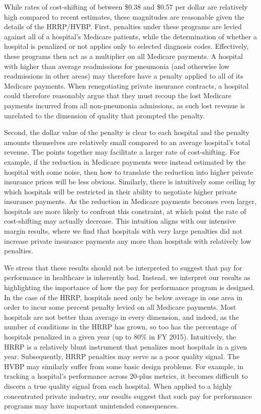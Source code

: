 \documentclass[12pt]{article}
\begin{document}
While rates of cost-shifting of between \$0.38 and \$0.57 per dollar are relatively high compared to recent estimates, these magnitudes are reasonable given the details of the HRRP/HVBP. First, penalties under these programs are levied against all of a hospital's Medicare patients, while the determination of whether a hospital is penalized or not applies only to selected diagnosis codes. Effectively, these programs then act as a multiplier on all Medicare payments. A hospital with higher than average readmissions for pneumonia (and otherwise low readmissions in other areas) may therefore have a penalty applied to all of its Medicare payments. When renegotiating private insurance contracts, a hospital could therefore reasonably argue that they must recoup the lost Medicare payments incurred from all non-pneumonia admissions, as such lost revenue is unrelated to the dimension of quality that prompted the penalty.

Second, the dollar value of the penalty is clear to each hospital and the penalty amounts themselves are relatively small compared to an average hospital's total revenue. The points together may facilitate a larger rate of cost-shifting. For example, if the reduction in Medicare payments were instead estimated by the hospital with some noise, then how to translate the reduction into higher private insurance prices will be less obvious. Similarly, there is intuitively some ceiling by which hospitals will be restricted in their ability to negotiate higher private insurance payments. As the reduction in Medicare payments becomes even larger, hospitals are more likely to confront this constraint, at which point the rate of cost-shifting may actually decrease. This intuition aligns with our intensive margin results, where we find that hospitals with very large penalties did not increase private insurance payments any more than hospitals with relatively low penalties.

We stress that these results should not be interpreted to suggest that pay for performance in healthcare is inherently bad. Instead, we interpret our results as highlighting the importance of how the pay for performance program is designed. In the case of the HRRP, hospitals need only be below average in one area in order to incur some percent penalty levied on all Medicare payments. Most hospitals are not better than average in every dimension, and indeed, as the number of conditions in the HRRP has grown, so too has the percentage of hospitals penalized in a given year (up to 80\% in FY 2015). Intuitively, the HRRP is a relatively blunt instrument that penalizes most hospitals in a given year. Subsequently, HRRP penalties may serve as a poor quality signal. The HVBP may similarly suffer from some basic design problems. For example, in tracking a hospital's performance across 20-plus metrics, it becomes difficult to discern a true quality signal from each hospital. When applied to a highly concentrated private industry, our results suggest that such pay for performance programs may have important unintended consequences.
\end{document}
